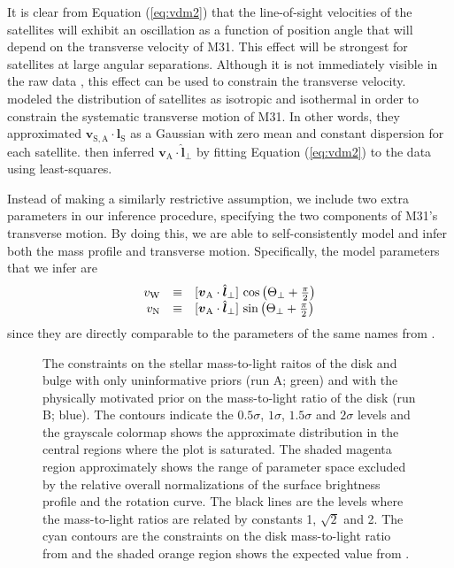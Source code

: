 \documentclass[preprint]{aastex}
\newcommand{\figlabel}[1]{\label{fig:#1}}
\newcommand{\eq}[1]{Equation (\ref{eq:#1})}
\newcommand{\bvec}[1]{\ensuremath{\boldsymbol{#1}}}
\renewcommand{\vector}[1]{\ensuremath{\bvec{#1}}}
\newcommand{\vel}[1]{\ensuremath{\vector{v}_\mathrm{#1}}}
\newcommand{\vrel}[2]{\ensuremath{\vector{v}_{\mathrm{#1},\mathrm{#2}}}}
\newcommand{\losperp}{\ensuremath{\hat{\vector{l}}_\perp}}
\newcommand{\lossat}{\ensuremath{\hat{\vector{l}}_\mathrm{S}}}
\newcommand{\posangperp}{\ensuremath{\Theta_\perp}}
\newcommand{\vw}{\ensuremath{v_\mathrm{W}}}
\newcommand{\vn}{\ensuremath{v_\mathrm{N}}}
\begin{document}
It is clear from \eq{vdm2} that the line-of-sight velocities of
the satellites will exhibit an oscillation as a function of position angle
that will depend on the transverse velocity of M31.  This effect will be
strongest for satellites at large angular separations.  Although it is not
immediately visible in the raw data \citep[see figure 1 of][]{vdm}, this
effect can be used to constrain the transverse velocity. \citet{vdm}
modeled the distribution of satellites as isotropic and isothermal in
order to constrain the systematic transverse motion of M31. In other words,
they approximated $\vrel{S}{A}\cdot\lossat$ as a Gaussian with zero mean
and constant dispersion for each satellite. \citet{vdm} then inferred
$\vel{A}\cdot\losperp$ by fitting \eq{vdm2} to the data using least-squares.

Instead of making a similarly restrictive assumption, we include two extra
parameters in our inference procedure, specifying the two components of M31's
transverse motion. By doing this, we are able to self-consistently model and
infer both the mass profile and transverse motion. Specifically, the
model parameters that we infer are
\begin{equation}
    \begin{array}{r c l}
    \vw & \equiv & [\vel{A}\cdot\losperp]
            \, \cos\left ( \posangperp + \frac{\pi}{2} \right ) \\
    \vn & \equiv & [\vel{A}\cdot\losperp]
            \, \sin \left ( \posangperp + \frac{\pi}{2} \right )
    \end{array}
\end{equation}
since they are directly comparable to the parameters of the same names
from \citet{vdm}.



\clearpage

\begin{figure}[tbp]
    \caption{The constraints on the stellar mass-to-light raitos of the disk
        and bulge with only uninformative priors (run A; green) and with the
        physically motivated prior on the mass-to-light ratio of the disk
        (run B; blue). The contours indicate the
        $0.5\sigma$, $1\sigma$, $1.5\sigma$ and $2\sigma$ levels and the
        grayscale colormap shows the approximate distribution in the central
        regions where the plot is saturated. The shaded magenta region
        approximately shows the range of parameter space excluded by the
        relative overall normalizations of the surface brightness profile
        and the rotation curve.
        The black lines are the levels where the mass-to-light ratios are
        related by constants 1, $\sqrt{2}$ and 2.
        The cyan contours are the constraints on the disk mass-to-light
        ratio from \citet{Bell:2003} and the shaded orange region shows the
        expected value from \citet{Courteau:1999a}.
        \figlabel{m2l}}
\end{figure}
\end{document}
